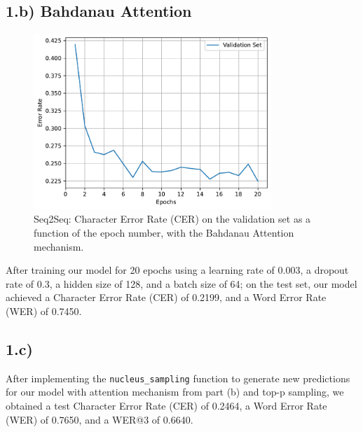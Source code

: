\documentclass[a4paper, 12pt]{article}
\begin{document}
\subsection*{1.b) Bahdanau Attention} 
\vspace{-0.8cm}
\begin{figure}[H]
    \centering
    \includegraphics[width=0.8\textwidth]{plot/q3/attn_True_err_rate.pdf}
    \caption{Seq2Seq: Character Error Rate (CER) on the validation set as a function of the epoch number, with the Bahdanau Attention mechanism. }
\end{figure}
After training our model for 20 epochs using a learning rate of 0.003, a dropout rate of 0.3, a hidden size of 128, and a batch size of 64; on the test set, our model achieved a Character Error Rate (CER) of 0.2199, and a Word Error Rate (WER) of  0.7450. 


\subsection*{1.c)}

After implementing the \texttt{nucleus\_sampling} function to generate new predictions for our model with attention mechanism from part (b) and  top-p sampling, we obtained a test Character Error Rate (CER) of 0.2464, a Word Error Rate (WER) of 0.7650, and a WER@3 of 0.6640.

 
 
\end{document}
